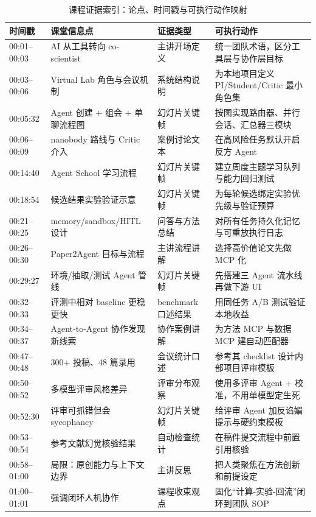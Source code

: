 \documentclass[a4paper]{article}
\begin{document}
\begin{table}[H]
\centering
\small
\begin{tabular}{p{}p{}p{}p{}}
\toprule
时间戳 & 课堂信息点 & 证据类型 & 可执行动作 \\
\midrule
00:01--00:03 & AI 从工具转向 co-scientist & 主讲开场定义 & 统一团队术语，区分工具层与协作层目标 \\
00:03--00:06 & Virtual Lab 角色与会议机制 & 系统结构说明 & 为本地项目定义 PI/Student/Critic 最小角色集 \\
00:05:32 & Agent 创建 + 组会 + 单聊流程图 & 幻灯片关键帧 & 按图实现路由器、并行会话、汇总器三模块 \\
00:06--00:09 & nanobody 路线与 Critic 介入 & 案例讨论文本 & 在高风险任务默认开启反方 Agent \\
00:14:40 & Agent School 学习流程 & 幻灯片关键帧 & 建立周度主题学习队列与能力回归测试 \\
00:18:54 & 候选结果实验验证示意 & 幻灯片关键帧 & 为每轮候选绑定实验优先级与验证预算 \\
00:21--00:25 & memory/sandbox/HITL 设计 & 问答与方法总结 & 对所有任务持久化记忆与可重放执行日志 \\
00:26--00:30 & Paper2Agent 目标与流程 & 主讲流程讲解 & 选择高价值论文先做 MCP 化 \\
00:29:27 & 环境/抽取/测试 Agent 管线 & 幻灯片关键帧 & 先搭建三 Agent 流水线再做下游 UI \\
00:32--00:33 & 评测中相对 baseline 更稳更快 & benchmark 口述结果 & 用同任务 A/B 测试验证本地收益 \\
00:34--00:37 & Agent-to-Agent 协作发现新线索 & 协作案例讲解 & 为方法 MCP 与数据 MCP 建自动匹配器 \\
00:47--00:48 & 300+ 投稿、48 篇录用 & 会议统计口述 & 参考其 checklist 设计内部项目评审模板 \\
00:50--00:52 & 多模型评审风格差异 & 评审分布观察 & 使用多评审 Agent + 校准，不用单模型定生死 \\
00:52:30 & 评审可抓错但会 sycophancy & 幻灯片关键帧 & 给评审 Agent 加反谄媚提示与硬约束模板 \\
00:53--00:54 & 参考文献幻觉核验结果 & 自动检查统计 & 在稿件提交流程中前置引用核验 \\
00:58--01:00 & 局限：原创能力与上下文边界 & 主讲反思 & 把人类聚焦在方法创新和前提设定 \\
01:00--01:01 & 强调闭环人机协作 & 课程收束观点 & 固化``计算-实验-回流''闭环到团队 SOP \\
\bottomrule
\end{tabular}
\caption{课程证据索引：论点、时间戳与可执行动作映射}
\label{tab:evidence-index}
\end{table}
\end{document}
